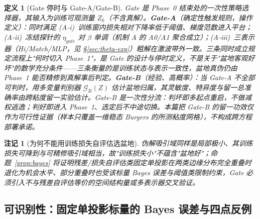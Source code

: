 \documentclass[fontset=windows,11pt]{ctexart}
\newtheorem{definition}{定义}[section]
\newtheorem*{remark}{注记}
\numberwithin{equation}{section}
\begin{document}
\begin{definition}[Gate 停时与 Gate-A/Gate-B]\label{def:gateAB}
Gate 是 Phase~0 结束处的\emph{一次性}策略选择器，其输入为训练可观测量 $Z_k$（不含真解）。\textbf{Gate-A}（确定性触发规则，操作定义）：同时满足 (A-i)~训练窗内损失相对下降率低于阈值、梯度范数进入平台；(A-ii)~冻结探针的 $\eta_{gate}$ 对 $\beta$ 单调（机制 A 的 A0/A1 聚合成立）；(A-iii)~三表示器（Hi/Match/MLP，见 \S\ref{sec:theta-exp}）粗解在激波带外一致。三条同时成立规定流程上"何时切入 Phase~1"，是 Gate 的设计与停时定义，\emph{不是}关于"盆地客观好坏"的数学充分条件——三条衡量的是训练状态与表示一致性，盆地真伪仍由 Phase~1 能否精修到真解事后判定。\textbf{Gate-B}（经验、高概率）：当 Gate-A 不全部可判时，用多变量判别器 $\mathcal G_B(Z)$ 估计盆地归属，其灵敏度、特异度与留一总准确率由跨粘度留一实验估计。Gate-B 是\emph{一次性分流}：判坏即多起点重启，不做减权逃逸；判好即进入 Phase~1、选定后不中途切换。本篇把 Gate-B 的留一功效仅作为\emph{可行性证据}（样本只覆盖一维稳态 Burgers 的所测粘度网格），不构成跨方程部署承诺。
\end{definition}

\begin{remark}[为何不能用训练损失自评估选盆地]\label{rem:noground}
伪解吸引域同样是局部极小、其训练损失可降到与可精修吸引域相当，故"训练损失小"不蕴含"盆地好"；命题~\ref{prop:bayes} 将证明残差/损失自评估类固定单投影在两类边缘分布完全重叠时退化为机会水平、部分重叠时也受该标量 Bayes 误差与阈值类限制约束，Gate 必须引入不与残差自评估等价的空间结构量或多表示器交叉验证。
\end{remark}

\subsection{可识别性：固定单投影标量的 Bayes 误差与四点反例}\label{sec:open}
\end{document}
